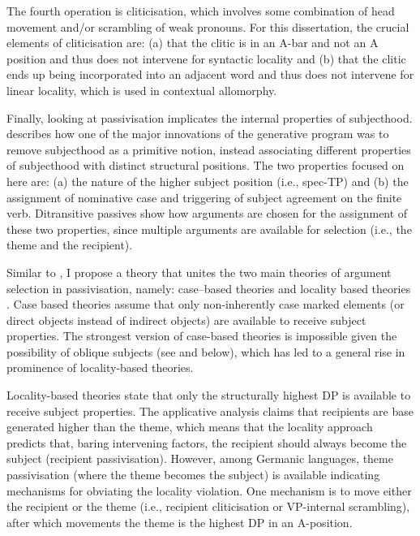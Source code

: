  The fourth operation is cliticisation, which involves some combination of head movement and/or scrambling of weak pronouns. For this dissertation, the crucial elements of cliticisation are: (a) that the clitic is in an A-bar and not an A position and thus does not intervene for syntactic locality and (b) that the clitic ends up being incorporated into an adjacent word and thus does not intervene for linear locality, which is used in contextual allomorphy.

Finally, looking at passivisation implicates the internal properties of subjecthood. \cite{McCloskey.1997} describes how one of the major innovations of the generative program was to remove subjecthood as a primitive notion, instead associating different properties of subjecthood with distinct structural positions. The two properties focused on here are: (a) the nature of the higher subject position (i.e., spec-TP) and (b) the assignment of nominative case and triggering of subject agreement on the finite verb. Ditransitive passives show how arguments are chosen for the assignment of these two properties, since multiple arguments are available for selection (i.e., the theme and the recipient).

Similar to \cite{Platzack.2005}, I propose a theory that unites the two main theories of argument selection in passivisation, namely: case--based theories \citep{Larson.1988,Baker.1988,Pesetsky.1996,Holmberg.2001} and locality based theories \citep{Falk.1990,Holmberg.1995,McGinnis.1998,Anagnostopoulou.2003}.  Case based theories assume that only non-inherently case marked elements (or direct objects instead of indirect objects) are available to receive subject properties. The strongest version of case-based theories is impossible given the possibility of oblique subjects (see \citealt{Zaenen.1985} and below), which has led to a general rise in prominence of locality-based theories.

Locality-based theories state that only the structurally highest DP is available to receive subject properties. The applicative analysis claims that recipients are base generated higher than the theme, which means that the locality approach predicts that, baring intervening factors, the recipient should always become the subject (recipient passivisation). However, among Germanic languages, theme passivisation (where the theme becomes the subject) is available indicating mechanisms for obviating the locality violation. One mechanism is to move either the recipient or the theme (i.e., recipient cliticisation or VP-internal scrambling), after which movements the theme is the highest DP in an A-position.

